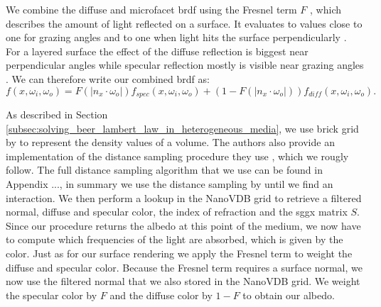We combine the diffuse and microfacet \ac{brdf} using the Fresnel term $F$ \cite{fresnel}, which describes the amount of light reflected on a surface.
It evaluates to values close to one for grazing angles and to one when light hits the surface perpendicularly \cite{pbr}.
For a layered surface the effect of the diffuse reflection is biggest near perpendicular angles while specular reflection mostly is visible near grazing angles \cite{pbr}.
We can therefore write our combined \ac{brdf} as:
\begin{equation*}
    f(x, \omega_i, \omega_o) = F(|n_x \cdot \omega_o|)f_{spec}(x, \omega_i, \omega_o) + (1 - F(|n_x \cdot \omega_o|))f_{diff}(x, \omega_i, \omega_o).
\end{equation*}

As described in Section \ref{subsec:solving_beer_lambert_law_in_heterogeneous_media}, we use brick grid by \citeauthor{brick_grid} \cite{brick_grid} to represent the density values of a volume.
The authors also provide an implementation of the distance sampling procedure they use \cite{brick_grid}, which we rougly follow.
The full distance sampling algorithm that we use can be found in Appendix ..., in summary we use the distance sampling by \cite{brick_grid} until we find an interaction. %
We then perform a lookup in the NanoVDB grid to retrieve a filtered normal, diffuse and specular color, the index of refraction and the \ac{sggx} matrix $S$.
Since our procedure returns the albedo at this point of the medium, we now have to compute which frequencies of the light are absorbed, which is given by the color.
Just as for our surface rendering we apply the Fresnel term to weight the diffuse and specular color.
Because the Fresnel term requires a surface normal, we now use the filtered normal that we also stored in the NanoVDB grid.
We weight the specular color by $F$ and the diffuse color by $1-F$ to obtain our albedo.

